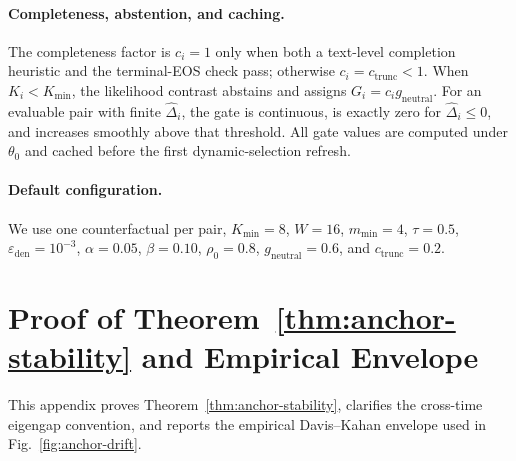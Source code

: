\paragraph{Completeness, abstention, and caching.}
The completeness factor is \(c_i=1\) only when both a text-level
completion heuristic and the terminal-EOS check pass; otherwise
\(c_i=c_{\mathrm{trunc}}<1\). When \(K_i<K_{\min}\), the likelihood
contrast abstains and assigns \(G_i=c_i g_{\mathrm{neutral}}\). For an
evaluable pair with finite \(\widehat{\Delta}_i\), the gate is continuous,
is exactly zero for \(\widehat{\Delta}_i\le0\), and increases smoothly
above that threshold. All gate values are computed under \(\theta_0\) and
cached before the first dynamic-selection refresh.

\paragraph{Default configuration.}
We use one counterfactual per pair, \(K_{\min}=8\), \(W=16\),
\(m_{\min}=4\), \(\tau=0.5\),
\(\varepsilon_{\mathrm{den}}=10^{-3}\), \(\alpha=0.05\),
\(\beta=0.10\), \(\rho_0=0.8\),
\(g_{\mathrm{neutral}}=0.6\), and \(c_{\mathrm{trunc}}=0.2\).

\vspace{-0.8em}
\section{Proof of Theorem~\ref{thm:anchor-stability} and Empirical Envelope}
\label{app:anchor-stability-diagnostics}
This appendix proves Theorem~\ref{thm:anchor-stability}, clarifies the
cross-time eigengap convention, and reports the empirical Davis--Kahan
envelope used in Fig.~\ref{fig:anchor-drift}.

\vspace{-0.6em}

